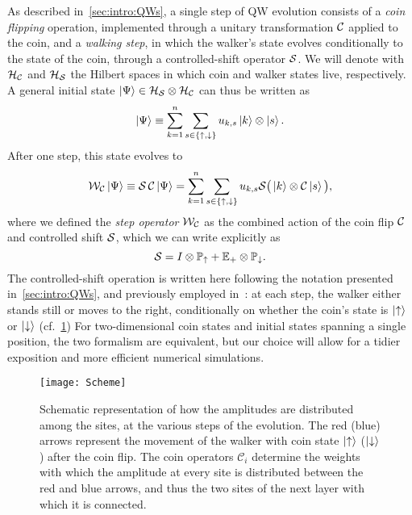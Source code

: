 As described in~\cref{sec:intro:QWs}, a single step of QW evolution consists of a \emph{coin flipping} operation, implemented through a unitary transformation ${\mathcal{C}}$ applied to the coin, and a \emph{walking step}, in which the walker's state evolves conditionally to the state of the coin, through a controlled-shift operator ${\mathcal{S}}$.
We will denote with ${{\mathcal{H}}_{\mathcal{C}}}$ and ${{\mathcal{H}}_{\mathcal{S}}}$ the Hilbert spaces in which coin and walker states live, respectively.
A general initial state $\ket\Psi\in{{\mathcal{H}}_{\mathcal{S}}}\otimes{{\mathcal{H}}_{\mathcal{C}}}$ can thus be written as
\begin{equation}
	\ket\Psi \equiv \sum_{k=1}^n \sum_{s\in\{\uparrow,\downarrow\}}
	u_{k,s} \ket{k} \otimes \ket{s}.
	\label{eq:initial_state}
\end{equation}
After one step, this state evolves to
\begin{equation}
	\mathcal W_{\mathcal C} \ket\Psi \equiv
	\mathcal S \,\mathcal C \ket\Psi
	= \sum_{k=1}^n \sum_{s\in\{\uparrow,\downarrow\}}
	u_{k,s}
	\mathcal S \big( \ket{k} \otimes \mathcal C \ket{s} \big),
	\label{eq:QWs:step_operator_definition}
\end{equation}
where we defined the \emph{step operator} ${\mathcal{W}}_{{\mathcal{C}}}$ as the combined action of the coin flip ${\mathcal{C}}$ and controlled shift ${\mathcal{S}}$, which we can write explicitly as
\begin{equation}
	{\mathcal{S}} =
    I\otimes {\mathbb{P}}_\uparrow + {\mathbb{E}}_+\otimes{\mathbb{P}}_\downarrow.
	\label{eq:QWs:controlled_shift_operator}
\end{equation}
The controlled-shift operation is written here following the notation presented in~\cref{sec:intro:QWs}, and previously employed in~\cite{hoyer2009faster,montero2013unidirectional,montero2015quantum}: at each step, the walker either stands still or moves to the right, conditionally on whether the coin's state is $\ket{\uparrow}$ or $\ket{\downarrow}$ (cf.~\cref{fig:QWs:conceptual_scheme_walker})
For two-dimensional coin states and initial states spanning a single position, the two formalism are equivalent, but our choice will allow for a tidier exposition and more efficient numerical simulations.

\begin{figure}[tb]
\center
\texttt{[image: Scheme]}
\caption{
    Schematic representation of how the amplitudes are distributed among the sites, at the various steps of the evolution.
    The red (blue) arrows represent the movement of the walker with coin state $\ket\uparrow$ ($\ket\downarrow$) after the coin flip.
    The coin operators $\mathcal C_i$ determine the weights with which the amplitude at every site is distributed between the red and blue arrows, and thus the two sites of the next layer with which it is connected.
}
\label{fig:QWs:conceptual_scheme_walker}
\end{figure}

